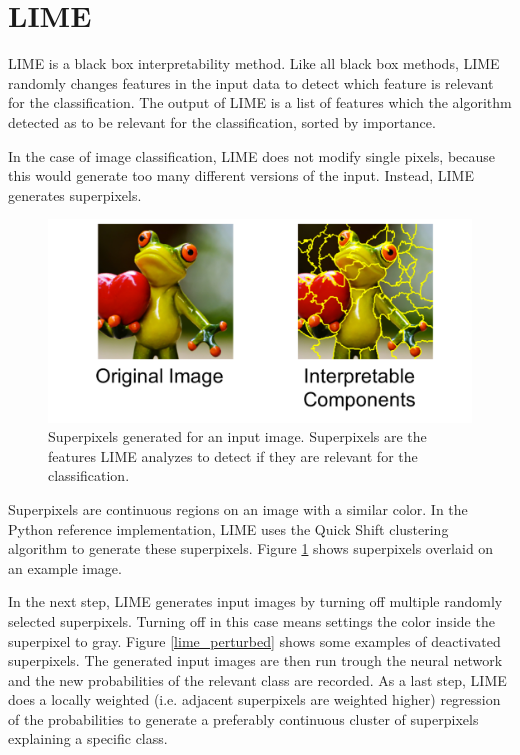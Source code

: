 \section{LIME}

LIME \cite{ribeiro2016should} is a black box interpretability method. Like all black box methods, LIME randomly changes features in the input data to detect which feature is relevant for the classification. The output of LIME is a list of features which the algorithm detected as to be relevant for the classification, sorted by importance.

In the case of image classification, LIME does not modify single pixels, because this would generate too many different versions of the input.
Instead, LIME generates superpixels.

\begin{figure}[H]
\centering
\includegraphics[width=12cm]{chapters/02_methods/images/lime.jpg}
\caption{Superpixels generated for an input image. Superpixels are the features LIME analyzes to detect if they are relevant for the classification.\cite{limeoreilly}}
\label{lime_superpixel}
\end{figure}

Superpixels are continuous regions on an image with a similar color. In the Python reference implementation, LIME uses the Quick Shift \cite{vedaldi2008quick} clustering algorithm to generate these superpixels. Figure \ref{lime_superpixel} shows superpixels overlaid on an example image.

In the next step, LIME generates input images by turning off multiple randomly selected superpixels. Turning off in this case means settings the color inside the superpixel to gray. Figure \ref{lime_perturbed} shows some examples of deactivated superpixels. The generated input images are then run trough the neural network and the new probabilities of the relevant class are recorded. 
As a last step, LIME does a locally weighted (i.e. adjacent superpixels are weighted higher) regression of the probabilities to generate a preferably continuous cluster of superpixels explaining a specific class.

